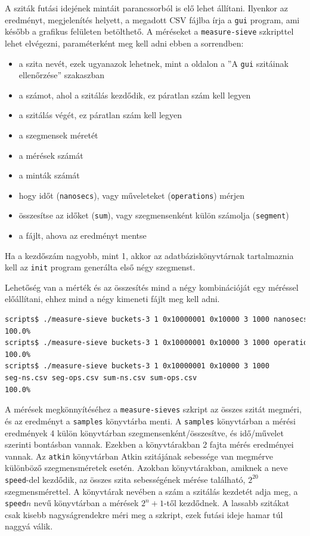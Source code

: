 A sziták futási idejének mintáit parancssorból is elő lehet állítani.
Ilyenkor az eredményt, megjelenítés helyett, a megadott CSV fájlba írja a \texttt{gui} program, ami később a grafikus felületen betölthető.
A méréseket a \texttt{measure-sieve} szkripttel lehet elvégezni, paraméterként meg kell adni ebben a sorrendben:
\begin{itemize}
\item a szita nevét, ezek ugyanazok lehetnek, mint a \pageref{sec:szitak-ellenorzese} oldalon a ''A \texttt{gui} szitáinak ellenőrzése'' szakaszban
\item a számot, ahol a szitálás kezdődik, ez páratlan szám kell legyen
\item a szitálás végét, ez páratlan szám kell legyen
\item a szegmensek méretét
\item a mérések számát
\item a minták számát
\item hogy időt (\texttt{nanosecs}), vagy műveleteket (\texttt{operations}) mérjen
\item összesítse az időket (\texttt{sum}), vagy szegmensenként külön számolja (\texttt{segment})
\item a fájlt, ahova az eredményt mentse
\end{itemize}

Ha a kezdőszám nagyobb, mint 1, akkor az adatbáziskönyvtárnak tartalmaznia kell az \texttt{init} program generálta első négy szegmenst.

Lehetőség van a mérték és az összesítés mind a négy kombinációját egy méréssel előállítani, ehhez mind a négy kimeneti fájlt meg kell adni.

\begin{lstlisting}[language=bash]
scripts$ ./measure-sieve buckets-3 1 0x10000001 0x10000 3 1000 nanosecs sum out1.csv
100.0%
scripts$ ./measure-sieve buckets-3 1 0x10000001 0x10000 3 1000 operations segment out2.csv
100.0%
scripts$ ./measure-sieve buckets-3 1 0x10000001 0x10000 3 1000
seg-ns.csv seg-ops.csv sum-ns.csv sum-ops.csv
100.0%
\end{lstlisting}

A mérések megkönnyítéséhez a \texttt{measure-sieves} szkript az összes szitát megméri, és az eredményt a \texttt{samples} könyvtárba menti.
A \texttt{samples} könyvtárban a mérési eredmények 4 külön könyvtárban szegmensenként/összesítve, és idő/művelet szerinti bontásban vannak.
Ezekben a könyvtárakban 2 fajta mérés eredményei vannak.
Az \texttt{atkin} könyvtárban Atkin szitájának sebessége van megmérve különböző szegmensméretek esetén.
Azokban könyvtárakban, amiknek a neve \texttt{speed}-del kezdődik, az összes szita sebességének mérése található, $2^{20}$ szegmensmérettel.
A könyvtárak nevében a szám a szitálás kezdetét adja meg, a \texttt{speed}$n$ nevű könyvtárban a mérések $2^n+1$-től kezdődnek.
A lassabb szitákat csak kisebb nagyságrendekre méri meg a szkript, ezek futási ideje hamar túl naggyá válik.

